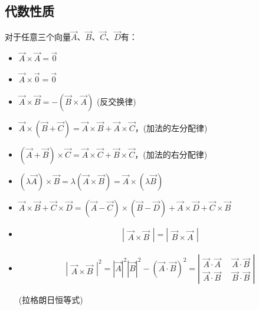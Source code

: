 \subsection{代数性质}
对于任意三个向量$\overrightarrow{A}$、$\overrightarrow{B}$、$\overrightarrow{C}$、$\overrightarrow{D}$有：
\begin{itemize}
\item $\overrightarrow{A} \times \overrightarrow{A} = \overrightarrow{0}$
\item $\overrightarrow{A} \times \overrightarrow{0} = \overrightarrow{0}$
\item $\overrightarrow{A} \times \overrightarrow{B} = -(\overrightarrow{B} \times \overrightarrow{A})$ (反交换律)
\item $\overrightarrow{A} \times (\overrightarrow{B} + \overrightarrow{C}) = \overrightarrow{A} \times \overrightarrow{B} + \overrightarrow{A} \times \overrightarrow{C}$，(加法的左分配律)
\item $(\overrightarrow{A} + \overrightarrow{B}) \times \overrightarrow{C} = \overrightarrow{A} \times \overrightarrow{C} + \overrightarrow{B} \times \overrightarrow{C}$，(加法的右分配律)
\item $(\lambda\overrightarrow{A}) \times \overrightarrow{B} = \lambda(\overrightarrow{A} \times \overrightarrow{B}) = \overrightarrow{A} \times (\lambda\overrightarrow{B})$
\item $\overrightarrow{A} \times \overrightarrow{B} + \overrightarrow{C} \times \overrightarrow{D} = (\overrightarrow{A} - \overrightarrow{C}) \times (\overrightarrow{B} - \overrightarrow{D}) + \overrightarrow{A} \times \overrightarrow{D} + \overrightarrow{C} \times \overrightarrow{B}$
\item 
\begin{eqnarray*}
\left|
\begin{array}{cccc}
\overrightarrow{A} \times \overrightarrow{B}
\end{array}
\right|
=
\left|
\begin{array}{cccc}
\overrightarrow{B} \times \overrightarrow{A}
\end{array}
\right|
\end{eqnarray*}
\item
\begin{eqnarray*}
\left|
\begin{array}{cccc}
\overrightarrow{A} \times \overrightarrow{B}
\end{array}
\right|^2 
=
|\overrightarrow{A}|^2|\overrightarrow{B}|^2 - (\overrightarrow{A} \cdot \overrightarrow{B})^2
=
\left|
\begin{array}{cccc}
\overrightarrow{A} \cdot \overrightarrow{A} \;&\; \overrightarrow{A} \cdot \overrightarrow{B} \\
\overrightarrow{A} \cdot \overrightarrow{B} \;&\; \overrightarrow{B} \cdot \overrightarrow{B}
\end{array}
\right|
\end{eqnarray*} 
\centerline{(拉格朗日恒等式)}
\end{itemize}


